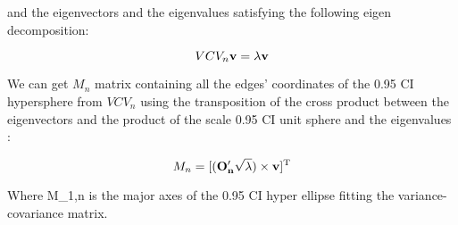 \documentclass[a4paper,11pt]{article}
\begin{document}
\begin{center}
and the eigenvectors  and the eigenvalues \lambda satisfying the following eigen decomposition:

\begin{equation}
    VCV_{n}\bold{v} = \lambda \bold{v}
\end{equation}

We can get $M_{n}$ matrix containing all the edges' coordinates of the 0.95 CI hypersphere from $VCV_{n}$ using the transposition of the cross product between the eigenvectors  and the product of the scale 0.95 CI unit sphere  and the eigenvalues \lambda:

\begin{equation}
    M_{n} = [(\bold{O'_{n}}\sqrt{\lambda}) \times \bold{v}]^{\text{T}}
\end{equation}

Where M_{1,n} is the major axes of the 0.95 CI hyper ellipse fitting the variance-covariance matrix.



\end{center}
\end{document}
